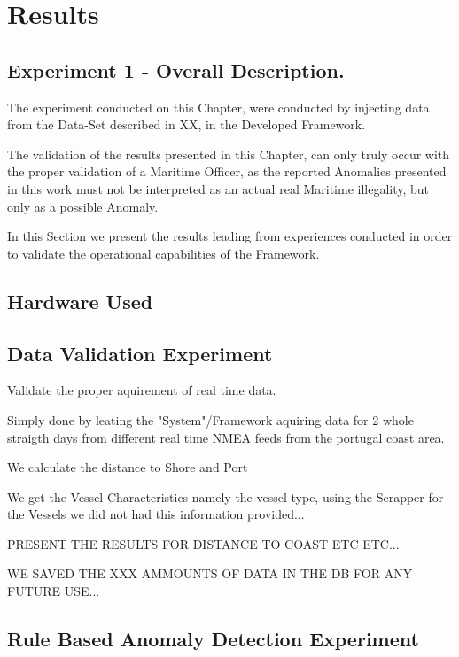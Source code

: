 \chapter{Results}
\label{chapter:Chapter 5}

\section{Experiment 1 - Overall Description.}
The experiment conducted on this Chapter, were conducted by injecting data from the Data-Set described in XX, in the Developed Framework.

The validation of the results presented in this Chapter, can only truly occur with the proper validation of a Maritime Officer, as the reported Anomalies presented in this work must not be interpreted as an actual real Maritime illegality, but only as a possible Anomaly. 

In this Section we present the results leading from experiences conducted in order to validate the operational capabilities of the Framework.

\section{Hardware Used}

\section{Data Validation Experiment}
\label{section: Experiment Data Val}
Validate the proper aquirement of real time data.

Simply done by leating the "System"/Framework aquiring data for 2 whole straigth days from different real time NMEA feeds from the portugal coast area.

We calculate the distance to Shore and Port

We get the Vessel Characteristics namely the vessel type, using the Scrapper for the Vessels we did not had this information provided...

PRESENT THE RESULTS FOR DISTANCE TO COAST ETC ETC...

WE SAVED THE XXX AMMOUNTS OF DATA IN THE DB FOR ANY FUTURE USE...


\section{Rule Based Anomaly Detection Experiment}
\label{section: Rule Based Anomaly Detection Experiment}


